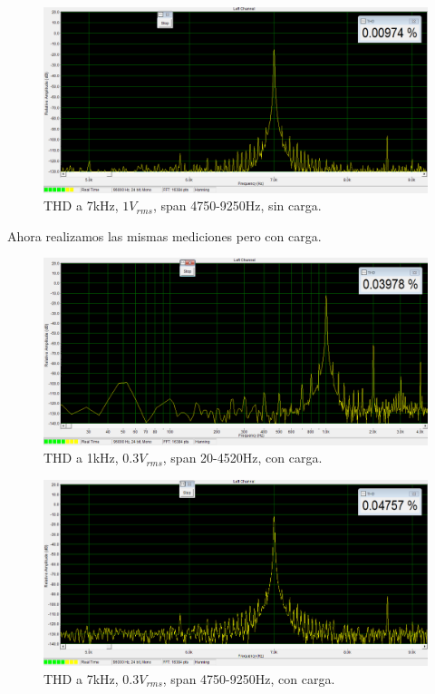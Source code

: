 \begin{figure}[H]
\centering
\includegraphics[width=\textwidth]{img/Distorsion/THD_7k_1V_span_4750_9250.png}
\caption{THD a 7kHz, $1V_{rms}$, span 4750-9250Hz, sin carga.}
\label{THD4} 
\end{figure}

Ahora realizamos las mismas mediciones pero con carga.

\begin{figure}[H]
\centering
\includegraphics[width=\textwidth]{img/Distorsion/THD_1k_03V_carga_span_20_4520.png}
\caption{THD a 1kHz, $0.3V_{rms}$, span 20-4520Hz, con carga.}
\label{THD5} 
\end{figure}

\begin{figure}[H]
\centering
\includegraphics[width=\textwidth]{img/Distorsion/THD_7k_03V_carga_span_4750_9250.png}
\caption{THD a 7kHz, $0.3V_{rms}$, span 4750-9250Hz, con carga.}
\label{THD6} 
\end{figure}

